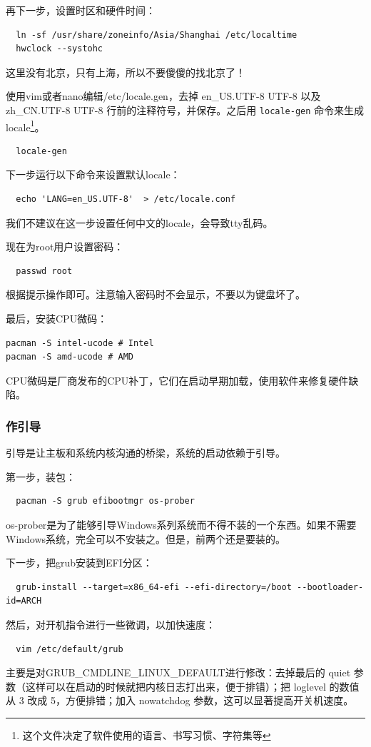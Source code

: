 再下一步，设置时区和硬件时间：
\begin{verbatim}
  ln -sf /usr/share/zoneinfo/Asia/Shanghai /etc/localtime
  hwclock --systohc
\end{verbatim}
这里没有北京，只有上海，所以不要傻傻的找北京了！

使用vim或者nano编辑/etc/locale.gen，去掉 en\_US.UTF-8 UTF-8 以及 zh\_CN.UTF-8 UTF-8 行前的注释符号，并保存。之后用 \texttt{locale-gen} 命令来生成locale\footnote{这个文件决定了软件使用的语言、书写习惯、字符集等}。

\begin{verbatim}
  locale-gen
\end{verbatim}

下一步运行以下命令来设置默认locale：
\begin{verbatim}
  echo 'LANG=en_US.UTF-8'  > /etc/locale.conf
\end{verbatim}
我们不建议在这一步设置任何中文的locale，会导致tty乱码。

现在为root用户设置密码：
\begin{verbatim}
  passwd root
\end{verbatim}
根据提示操作即可。注意输入密码时不会显示，不要以为键盘坏了。

最后，安装CPU微码：
\begin{verbatim}
pacman -S intel-ucode # Intel
pacman -S amd-ucode # AMD
\end{verbatim}
CPU微码是厂商发布的CPU补丁，它们在启动早期加载，使用软件来修复硬件缺陷。

\subsubsection{作引导}

引导是让主板和系统内核沟通的桥梁，系统的启动依赖于引导。

第一步，装包：
\begin{verbatim}
  pacman -S grub efibootmgr os-prober
\end{verbatim}
os-prober是为了能够引导Windows系列系统而不得不装的一个东西。如果不需要Windows系统，完全可以不安装之。但是，前两个还是要装的。

下一步，把grub安装到EFI分区：
\begin{verbatim}
  grub-install --target=x86_64-efi --efi-directory=/boot --bootloader-id=ARCH
\end{verbatim}

然后，对开机指令进行一些微调，以加快速度：
\begin{verbatim}
  vim /etc/default/grub
\end{verbatim}
主要是对GRUB\_CMDLINE\_LINUX\_DEFAULT进行修改：去掉最后的 quiet 参数（这样可以在启动的时候就把内核日志打出来，便于排错）；把 loglevel 的数值从 3 改成 5，方便排错；加入 nowatchdog 参数，这可以显著提高开关机速度。

